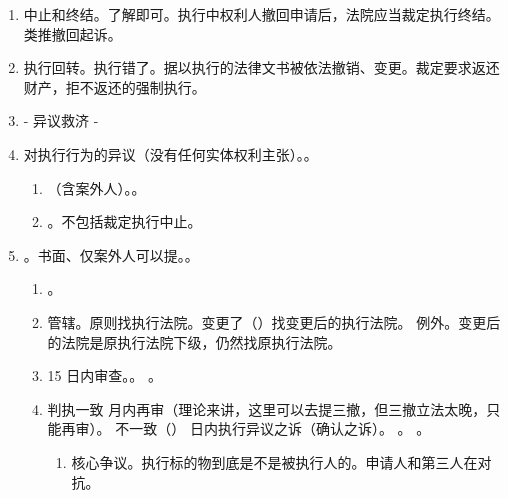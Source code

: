 \begin{enumerate}
\begin{enumerate}
\begin{enumerate}
                  \item 直接。不考虑先诉抗辩权、不需要把担保人变更追加为被执行人。
                  \item 执行担保人的，以担保范围为限，以担保期间为限（担保人不再承担担保责任）。
                \end{enumerate}
        \end{enumerate}
  \item 中止和终结。了解即可。执行中权利人撤回申请后，法院应当裁定执行终结。类推撤回起诉。
  \item 执行回转。执行错了。据以执行的法律文书被依法撤销、变更。裁定要求返还财产，拒不返还的强制执行。
  \item - 异议救济 -
  \item 对执行行为的异议（没有任何实体权利主张）。。
        \begin{enumerate}
          \item {}（含案外人）。。
          \item {}。不包括裁定执行中止。
        \end{enumerate}
  \item {}。书面、仅案外人可以提。。
        \begin{enumerate}
          \item {}。
          \item 管辖。原则找执行法院。变更了（）找变更后的执行法院。
                例外。变更后的法院是原执行法院下级，仍然找原执行法院。
          \item 15 日内审查。\yi {}。\er {} \xjt。
          \item \yi 判执一致  月内再审（理论来讲，这里可以去提三撤，但三撤立法太晚，只能再审）。
                \er 不一致（）  日内执行异议之诉（确认之诉）。
                。
                。
                \begin{enumerate}
                  \item 核心争议。执行标的物到底是不是被执行人的。申请人和第三人在对抗。

\end{enumerate}
\end{enumerate}
\end{enumerate}
